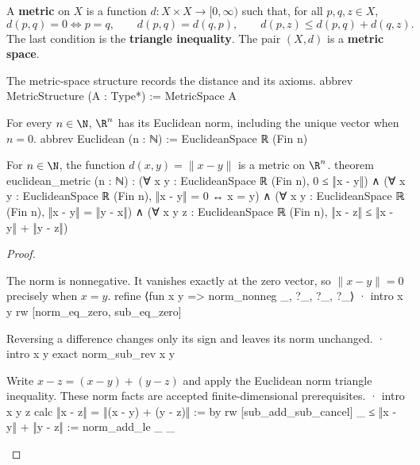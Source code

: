\begin{definition} \label{an1:def:metric-space}
  A \textbf{metric} on $X$ is a function $d:X\times X\to[0,\infty)$ such that, for all $p,q,z\in X$,
  \[
    d(p,q)=0\iff p=q,\qquad d(p,q)=d(q,p),\qquad d(p,z)\leq d(p,q)+d(q,z).
  \]
  The last condition is the \textbf{triangle inequality}. The pair $(X,d)$ is a \textbf{metric space}.
  \begin{lean}{The metric-space structure records the distance and its axioms.}
    abbrev MetricStructure (A : Type*) := MetricSpace A
  \end{lean}
  \begin{lean}{For every $n\in\N$, $\R^{n}$ has its Euclidean norm, including the unique vector when $n=0$.}
    abbrev Euclidean (n : ℕ) := EuclideanSpace ℝ (Fin n)
  \end{lean}
\end{definition}

\begin{proposition} \label{an1:thm:standard-metric-on-Rn}
  \begin{lean}{For $n\in\N$, the function $d(x,y)=\|x-y\|$ is a metric on $\R^{n}$.}
    theorem euclidean_metric (n : ℕ) :
        (∀ x y : EuclideanSpace ℝ (Fin n), 0 ≤ ‖x - y‖) ∧
        (∀ x y : EuclideanSpace ℝ (Fin n), ‖x - y‖ = 0 ↔ x = y) ∧
        (∀ x y : EuclideanSpace ℝ (Fin n), ‖x - y‖ = ‖y - x‖) ∧
        (∀ x y z : EuclideanSpace ℝ (Fin n),
          ‖x - z‖ ≤ ‖x - y‖ + ‖y - z‖)
  \end{lean}
\end{proposition}

\begin{proof}
  \begin{lean}{The norm is nonnegative. It vanishes exactly at the zero vector, so $\|x-y\|=0$ precisely when $x=y$.}
    refine ⟨fun x y => norm_nonneg _, ?_, ?_, ?_⟩
    · intro x y
      rw [norm_eq_zero, sub_eq_zero]
  \end{lean}

  \begin{lean}{Reversing a difference changes only its sign and leaves its norm unchanged.}
    · intro x y
      exact norm_sub_rev x y
  \end{lean}

  \begin{lean}{Write $x-z=(x-y)+(y-z)$ and apply the Euclidean norm triangle inequality. These norm facts are accepted finite-dimensional prerequisites.}
    · intro x y z
      calc
        ‖x - z‖ = ‖(x - y) + (y - z)‖ := by rw [sub_add_sub_cancel]
        _ ≤ ‖x - y‖ + ‖y - z‖ := norm_add_le _ _
  \end{lean}

\end{proof}

